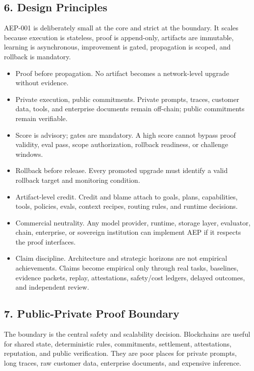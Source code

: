 \documentclass[
]{article}
\providecommand{\tightlist}{%
  \setlength{\itemsep}{0pt}\setlength{\parskip}{0pt}}
\begin{document}
\subsection{6. Design Principles}\label{design-principles}

AEP-001 is deliberately small at the core and strict at the boundary. It
scales because execution is stateless, proof is append-only, artifacts
are immutable, learning is asynchronous, improvement is gated,
propagation is scoped, and rollback is mandatory.

\begin{itemize}
\tightlist
\item
  Proof before propagation. No artifact becomes a network-level upgrade
  without evidence.
\item
  Private execution, public commitments. Private prompts, traces,
  customer data, tools, and enterprise documents remain off-chain;
  public commitments remain verifiable.
\item
  Score is advisory; gates are mandatory. A high score cannot bypass
  proof validity, eval pass, scope authorization, rollback readiness, or
  challenge windows.
\item
  Rollback before release. Every promoted upgrade must identify a valid
  rollback target and monitoring condition.
\item
  Artifact-level credit. Credit and blame attach to goals, plans,
  capabilities, tools, policies, evals, context recipes, routing rules,
  and runtime decisions.
\item
  Commercial neutrality. Any model provider, runtime, storage layer,
  evaluator, chain, enterprise, or sovereign institution can implement
  AEP if it respects the proof interfaces.
\item
  Claim discipline. Architecture and strategic horizons are not
  empirical achievements. Claims become empirical only through real
  tasks, baselines, evidence packets, replay, attestations, safety/cost
  ledgers, delayed outcomes, and independent review.
\end{itemize}

\subsection{7. Public-Private Proof
Boundary}\label{public-private-proof-boundary}

The boundary is the central safety and scalability decision. Blockchains
are useful for shared state, deterministic rules, commitments,
settlement, attestations, reputation, and public verification. They are
poor places for private prompts, long traces, raw customer data,
enterprise documents, and expensive inference.
\end{document}
